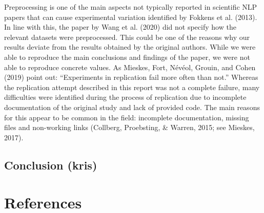 \documentclass[
  english,
  man,floatsintext]{apa6}
\begin{document}
Preprocessing is one of the main aspects not typically reported in scientific NLP papers that can cause experimental variation identified by Fokkens et al. (2013). In line with this, the paper by Wang et al. (2020) did not specify how the relevant datasets were preprocessed. This could be one of the reasons why our results deviate from the results obtained by the original authors. While we were able to reproduce the main conclusions and findings of the paper, we were not able to reproduce concrete values. As Mieskes, Fort, Névéol, Grouin, and Cohen (2019) point out: ``Experiments in replication fail more often than not.'' Whereas the replication attempt described in this report was not a complete failure, many difficulties were identified during the process of replication due to incomplete documentation of the original study and lack of provided code. The main reasons for this appear to be common in the field: incomplete documentation, missing files and non-working links (Collberg, Proebsting, \& Warren, 2015; see Mieskes, 2017).

\hypertarget{conclusion-kris}{%
\subsection{Conclusion (kris)}\label{conclusion-kris}}

\newpage

\hypertarget{references}{%
\section{References}\label{references}}

\begingroup
\setlength{\parindent}{-0.5in}
\setlength{\leftskip}{0.5in}
\end{document}
